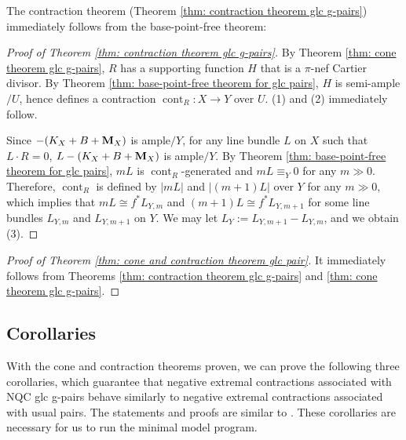 \documentclass[11pt]{amsart}
\numberwithin{equation}{section}
\newcommand{\Mm}{{\bf{M}}}
\newcommand{\cont}{\operatorname{cont}}
\theoremstyle{definition}
\theoremstyle{definition}
\theoremstyle{definition}
\begin{document}
The contraction theorem (Theorem \ref{thm: contraction theorem glc g-pairs}) immediately follows from the base-point-free theorem:

\begin{proof}[Proof of Theorem \ref{thm: contraction theorem glc g-pairs}]
By Theorem \ref{thm: cone theorem glc g-pairs}, $R$ has a supporting function $H$ that is a $\pi$-nef Cartier divisor. By Theorem \ref{thm: base-point-free theorem for glc pairs}, $H$ is semi-ample$/U$, hence defines a contraction $\cont_R: X\rightarrow Y$ over $U$. (1) and (2) immediately follow.

Since $-(K_X+B+\Mm_X)$ is ample$/Y$, for any line bundle $L$ on $X$ such that $L\cdot R=0$, $L-(K_X+B+\Mm_X)$ is ample$/Y$. By Theorem \ref{thm: base-point-free theorem for glc pairs}, $mL$ is $\cont_R$-generated and $mL\equiv_Y0$ for any $m\gg 0$. Therefore, $\cont_R$ is defined by $|mL|$ and $|(m+1)L|$ over $Y$ for any $m\gg 0$, which implies that $mL\cong f^*L_{Y,m}$ and $(m+1)L\cong f^*L_{Y,m+1}$ for some line bundles $L_{Y,m}$ and $L_{Y,m+1}$ on $Y$. We may let $L_Y:=L_{Y,m+1}-L_{Y,m}$, and we obtain (3).
\end{proof}


\begin{proof}[Proof of Theorem \ref{thm: cone and contraction theorem glc pair}] It immediately follows from Theorems \ref{thm: contraction theorem glc g-pairs} and \ref{thm: cone theorem glc g-pairs}.
\end{proof}

\subsection{Corollaries} With the cone and contraction theorems proven, we can prove the following three corollaries, which guarantee that negative extremal contractions associated with NQC glc g-pairs behave similarly to negative extremal contractions associated with usual pairs. The statements and proofs are similar to \cite[Corollaries 3.17, 3.18]{KM98}. These corollaries are necessary for us to run the minimal model program.
\end{document}
